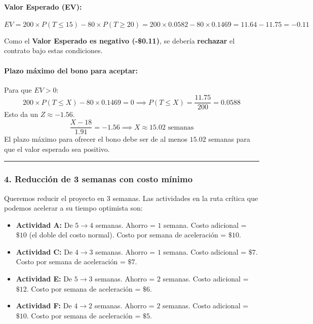 \documentclass[
]{article}
\providecommand{\tightlist}{%
  \setlength{\itemsep}{0pt}\setlength{\parskip}{0pt}}
\begin{document}
\hypertarget{valor-esperado-ev}{%
\paragraph{Valor Esperado (EV):}\label{valor-esperado-ev}}

\[EV = 200 \times P(T \le 15) - 80 \times P(T \ge 20) = 200 \times 0.0582 - 80 \times 0.1469 = 11.64 - 11.75 = -0.11\]

Como el \textbf{Valor Esperado es negativo (-\$0.11)}, se debería
\textbf{rechazar} el contrato bajo estas condiciones.

\hypertarget{plazo-muxe1ximo-del-bono-para-aceptar}{%
\paragraph{Plazo máximo del bono para
aceptar:}\label{plazo-muxe1ximo-del-bono-para-aceptar}}

Para que \(EV > 0\):
\[200 \times P(T \le X) - 80 \times 0.1469 = 0 \implies P(T \le X) = \frac{11.75}{200} = 0.0588\]
Esto da un \(Z \approx -1.56\).
\[\frac{X - 18}{1.91} = -1.56 \implies X \approx 15.02 \text{ semanas}\]
El plazo máximo para ofrecer el bono debe ser de al menos \(15.02\)
semanas para que el valor esperado sea positivo.

\begin{center}\rule{0.5\linewidth}{0.5pt}\end{center}

\hypertarget{reducciuxf3n-de-3-semanas-con-costo-muxednimo}{%
\subsubsection{4. Reducción de 3 semanas con costo
mínimo}\label{reducciuxf3n-de-3-semanas-con-costo-muxednimo}}

Queremos reducir el proyecto en 3 semanas. Las actividades en la ruta
crítica que podemos acelerar a su tiempo optimista son:

\begin{itemize}
\tightlist
\item
  \textbf{Actividad A:} De \(5 \rightarrow 4\) semanas. Ahorro = \(1\)
  semana. Costo adicional = \(\$10\) (el doble del costo normal). Costo
  por semana de aceleración = \(\$10\).
\item
  \textbf{Actividad C:} De \(4 \rightarrow 3\) semanas. Ahorro = \(1\)
  semana. Costo adicional = \(\$7\). Costo por semana de aceleración =
  \(\$7\).
\item
  \textbf{Actividad E:} De \(5 \rightarrow 3\) semanas. Ahorro = \(2\)
  semanas. Costo adicional = \(\$12\). Costo por semana de aceleración =
  \(\$6\).
\item
  \textbf{Actividad F:} De \(4 \rightarrow 2\) semanas. Ahorro = \(2\)
  semanas. Costo adicional = \(\$10\). Costo por semana de aceleración =
  \(\$5\).
\end{itemize}
\end{document}
